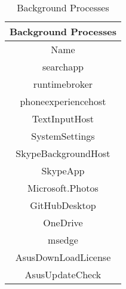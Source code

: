 \begin{table}[H]
    \centering
    \begin{tabular}{|| c ||}
    \hline
    \multicolumn{1}{||c||}{Background Processes} \\ [0.5ex] \hline\hline
    Name \\\hline
    searchapp \\
    runtimebroker \\
    phoneexperiencehost \\
    TextInputHost \\
    SystemSettings \\
    SkypeBackgroundHost \\
    SkypeApp \\
    Microsoft.Photos \\
    GitHubDesktop \\
    OneDrive \\
    msedge \\
    AsusDownLoadLicense \\
    AsusUpdateCheck \\\hline
    \end{tabular}
    \caption{Background Processes}
    \label{tab:background_processes}
\end{table}